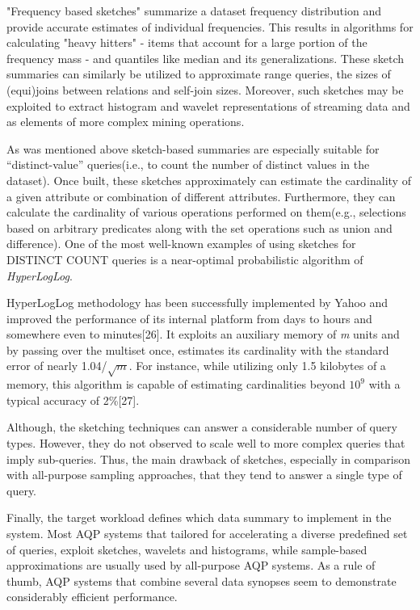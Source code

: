 \documentclass[10pt, conference, compsocconf]{IEEEtran}
\begin{document}
"Frequency based sketches" summarize a dataset frequency distribution and provide accurate estimates of individual frequencies. This results in algorithms for calculating "heavy hitters" - items that account for a large portion of the frequency mass - and quantiles like median and its generalizations. These sketch summaries can similarly be utilized to approximate range queries, the sizes of (equi)joins between relations and self-join sizes. Moreover, such sketches may be exploited to extract histogram and wavelet representations of streaming data and as elements of more complex mining operations.

As was mentioned above sketch-based summaries are especially suitable for “distinct-value” queries(i.e., to count the number of distinct values in the dataset). Once built, these sketches approximately can estimate the cardinality of a given attribute or combination of different attributes. Furthermore, they can calculate the cardinality of various operations performed on them(e.g., selections based on arbitrary predicates along with the set operations such as union and difference). One of the most well-known examples of using sketches for DISTINCT COUNT queries is a near-optimal probabilistic algorithm of \textit{HyperLogLog}. 

HyperLogLog methodology has been successfully implemented by Yahoo and improved the performance of its internal platform from days to hours and somewhere even to minutes[26]. It exploits an auxiliary memory of \textit{m} units and by passing over the multiset once, estimates its cardinality with the standard error of nearly 1.04/$\sqrt{\textit{m}}$. For instance, while utilizing only 1.5 kilobytes of a memory, this algorithm is capable of estimating cardinalities beyond $10^9$ with a typical accuracy of 2\%[27].

Although, the sketching techniques can answer a considerable number of query types. However, they do not observed to scale well to more complex queries that imply sub-queries. Thus, the main drawback of sketches, especially in comparison with all-purpose sampling approaches, that they tend to answer a single type of query. 

Finally, the target workload defines which data summary to implement in the system. Most AQP systems that tailored for accelerating a diverse predefined set of queries, exploit sketches, wavelets and histograms, while sample-based approximations are usually used by all-purpose AQP systems. As a rule of thumb, AQP systems that combine several data synopses seem to demonstrate considerably efficient performance. 
\end{document}

